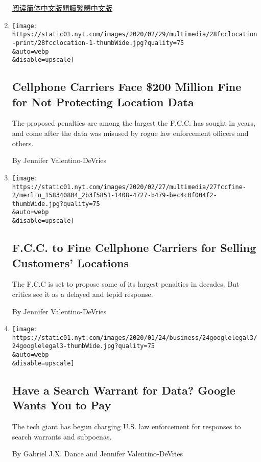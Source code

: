 \begin{enumerate}
  \href{https://cn.nytimes.com/world/20200320/coronavirus-location-tracking/}{阅读简体中文版}\href{https://cn.nytimes.com/world/20200320/coronavirus-location-tracking/zh-hanty}{閱讀繁體中文版}
\item
  \href{/2020/02/28/technology/fcc-cellphones-location-data-fines.html}{}

  \texttt{[image: https://static01.nyt.com/images/2020/02/29/multimedia/28fcclocation-print/28fcclocation-1-thumbWide.jpg?quality=75\\\&auto=webp\\\&disable=upscale]}

  \hypertarget{cellphone-carriers-face-200-million-fine-for-not-protecting-location-data}{%
  \subsection{Cellphone Carriers Face \$200 Million Fine for Not
  Protecting Location
  Data}\label{cellphone-carriers-face-200-million-fine-for-not-protecting-location-data}}

  The proposed penalties are among the largest the F.C.C. has sought in
  years, and come after the data was misused by rogue law enforcement
  officers and others.

  By Jennifer Valentino-DeVries
\item
  \href{/2020/02/27/technology/fcc-location-data.html}{}

  \texttt{[image: https://static01.nyt.com/images/2020/02/27/multimedia/27fccfine-2/merlin\_158340804\_2b3f5851-1408-4727-b479-bec4c0f004f2-thumbWide.jpg?quality=75\\\&auto=webp\\\&disable=upscale]}

  \hypertarget{fcc-to-fine-cellphone-carriers-for-selling-customers-locations}{%
  \subsection{F.C.C. to Fine Cellphone Carriers for Selling Customers'
  Locations}\label{fcc-to-fine-cellphone-carriers-for-selling-customers-locations}}

  The F.C.C is set to propose some of its largest penalties in decades.
  But critics see it as a delayed and tepid response.

  By Jennifer Valentino-DeVries
\item
  \href{/2020/01/24/technology/google-search-warrants-legal-fees.html}{}

  \texttt{[image: https://static01.nyt.com/images/2020/01/24/business/24googlelegal3/24googlelegal3-thumbWide.jpg?quality=75\\\&auto=webp\\\&disable=upscale]}

  \hypertarget{have-a-search-warrant-for-data-google-wants-you-to-pay}{%
  \subsection{Have a Search Warrant for Data? Google Wants You to
  Pay}\label{have-a-search-warrant-for-data-google-wants-you-to-pay}}

  The tech giant has begun charging U.S. law enforcement for responses
  to search warrants and subpoenas.

  By Gabriel J.X. Dance and Jennifer Valentino-DeVries
\end{enumerate}

